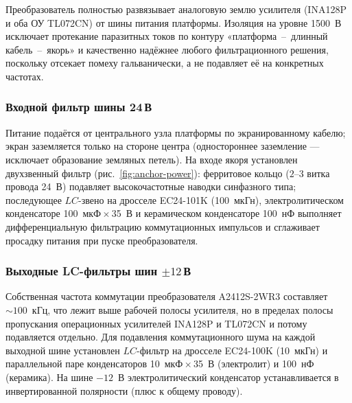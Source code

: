 Преобразователь полностью развязывает аналоговую землю усилителя (INA128P и оба ОУ
TL072CN) от шины питания платформы. Изоляция на уровне 1500~В исключает протекание
паразитных токов по контуру «платформа~--~длинный кабель~--~якорь» и качественно
надёжнее любого фильтрационного решения, поскольку отсекает помеху гальванически,
а не подавляет её на конкретных частотах.

\subsubsection{Входной фильтр шины 24\,В}

Питание подаётся от центрального узла платформы по экранированному кабелю; экран
заземляется только на стороне центра (одностороннее заземление --- исключает
образование земляных петель). На входе якоря установлен двухзвенный фильтр
(рис.~\ref{fig:anchor-power}): ферритовое кольцо ($2$--$3$ витка провода 24~В)
подавляет высокочастотные наводки синфазного типа; последующее $LC$-звено на дросселе
EC24-101K (100~мкГн), электролитическом конденсаторе 100~мкФ\,$\times$\,35~В и
керамическом конденсаторе 100~нФ выполняет дифференциальную фильтрацию коммутационных
импульсов и сглаживает просадку питания при пуске преобразователя.

\subsubsection{Выходные LC-фильтры шин $\pm 12$\,В}

Собственная частота коммутации преобразователя A2412S-2WR3 составляет ${\sim}100$~кГц,
что лежит выше рабочей полосы усилителя, но в пределах полосы пропускания операционных
усилителей INA128P и TL072CN и потому подавляется отдельно. Для подавления коммутационного
шума на каждой выходной шине установлен $LC$-фильтр на дросселе EC24-100K (10~мкГн)
и параллельной паре конденсаторов 10~мкФ\,$\times$\,35~В (электролит) и 100~нФ (керамика).
На шине $-12$~В электролитический конденсатор устанавливается в инвертированной полярности
(плюс к общему проводу).

